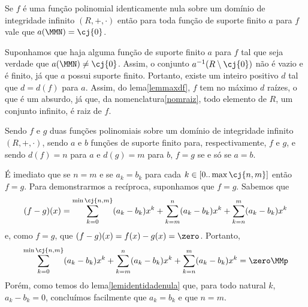 \begin{Funções polinomiais}
\begin{Lem}\label{lemidentidadenula}
  Se $f$ é uma função polinomial identicamente nula sobre um domínio de
  integridade infinito $(R,+,\cdot)$ então para
  toda função de suporte finito
  $a$ para $f$ vale que $a(\MMN)=\cj{0}$.
\end{Lem}

\begin{dem}
  Suponhamos que haja alguma função de suporte finito
  $a$ para $f$ tal que seja verdade que $a(\MMN)\neq \cj{0}$. Assim, o
  conjunto $a^{-1}(R\setminus\cj{0})$ não é vazio e é finito,
  já que $a$ possui
  suporte finito. Portanto, existe um inteiro positivo $d$ tal
  que $d=d(f)$ para $a$. Assim, do lema\xspace\ref{lemmaxdf}, $f$ tem no
  máximo $d$ raízes, o que é um absurdo, já que, da
  nomenclatura\xspace\ref{nomraiz}, todo elemento de $R$, um conjunto
  infinito, é raiz de $f$.
\end{dem}

\begin{Teo}\label{teopip}
  \mbox{}
  Sendo $f$ e $g$ duas funções polinomiais sobre um domínio de
  integridade infinito $(R,+,\cdot)$,
  sendo $a$ e $b$ funções de suporte finito para, respectivamente, $f$
  e $g$, e sendo $d(f)=n$ para $a$ e $d(g)=m$ para $b$,
  $f=g$ se e só se $a=b$.
\end{Teo}

\begin{dem}
  É imediato que se $n=m$ e se $a_k=b_k$ para cada
  $k\in[0..\max\cj{n,m}]$ então $f=g$. Para demonstrarmos a recíproca,
  suponhamos
  que $f=g$. Sabemos que
  \begin{equation*}
    (f-g)(x) = \sum_{k=0}^{\min\cj{n,m}} (a_k-b_k)x^k
             + \sum_{k=m}^n (a_k-b_k)x^k + \sum_{k=n}^m (a_k-b_k)x^k
  \end{equation*}
  e, como $f=g$, que $(f-g)(x)=f(x)-g(x)=\zero$. Portanto,
  \begin{equation*}
    \sum_{k=0}^{\min\cj{n,m}} (a_k-b_k)x^k
             + \sum_{k=m}^n (a_k-b_k)x^k + \sum_{k=n}^m (a_k-b_k)x^k
             = \zero\MMp
  \end{equation*}
  Porém, como temos do lema\xspace\ref{lemidentidadenula} que, para todo
  natural $k$, $a_k-b_k=0$, concluímos facilmente
  que $a_k=b_k$ e que $n=m$.
\end{dem}


\end{Funções polinomiais}
